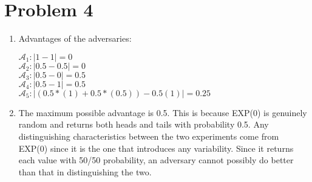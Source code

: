 \documentclass{article}
\begin{document}
\section*{Problem 4}
\begin{enumerate}
\item %
Advantages of the adversaries:

$\mathcal{A}_1: |1 - 1| = 0$\\
$\mathcal{A}_2: |0.5 - 0.5| = 0$\\
$\mathcal{A}_3: |0.5 - 0| = 0.5$\\
$\mathcal{A}_4: |0.5 - 1| = 0.5$\\
$\mathcal{A}_5: |(0.5*(1) + 0.5*(0.5)) - 0.5(1)| = 0.25$

\item %
The maximum possible advantage is 0.5. This is because EXP(0) is genuinely random and returns both heads and tails with probability 0.5. Any distinguishing characteristics between the two experiments come from EXP(0) since it is the one that introduces any variability. Since it returns each value with 50/50 probability, an adversary cannot possibly do better than that in distinguishing the two.
\end{enumerate}
\end{document}
